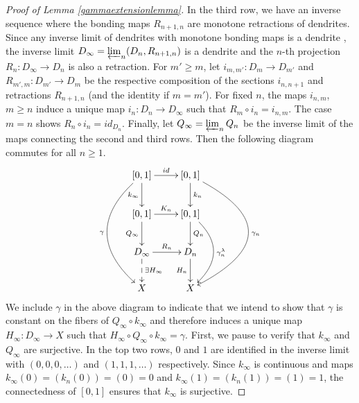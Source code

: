 \documentclass[12pt, leqno]{amsart}
\newcommand{\light}{\lambda}
\newcommand{\ui}{[0,1]}
\theoremstyle{definition}\newtheorem{definition}[theorem]{Definition}
\begin{document}
\begin{proof}[Proof of Lemma \ref{gammaextensionlemma}]
In the third row, we have an inverse sequence where the bonding maps $R_{n+1,n}$ are monotone retractions of dendrites. Since any inverse limit of dendrites with monotone bonding maps is a dendrite \cite[Theorem 10.36]{Nadler}, the inverse limit $D_{\infty}=\varprojlim_{n}(D_n,R_{n+1,n})$ is a dendrite and the $n$-th projection $R_n:D_{\infty}\to D_n$ is also a retraction. For $m'\geq m$, let $i_{m,m'}:D_m\to D_{m'}$ and $R_{m',m}:D_{m'}\to D_m$ be the respective composition of the sections $i_{n,n+1}$ and retractions $R_{n+1,n}$ (and the identity if $m=m'$). For fixed $n$, the maps $i_{n,m}$, $m\geq n$ induce a unique map $i_n:D_n\to D_{\infty}$ such that $R_m\circ i_n=i_{n,m}$. The case $m=n$ shows $R_n\circ i_n=id_{D_n}$. Finally, let $Q_{\infty}=\varprojlim_{n}Q_n$ be the inverse limit of the maps connecting the second and third rows. Then the following diagram commutes for all $n\geq 1$.
\[\xymatrix{
\ar@/_3pc/[ddd]_-{\gamma} \ui \ar[d]_-{k_{\infty}} \ar[r]^-{id} & \ui \ar[d]^-{k_{n}} \ar@/^5pc/[ddd]^-{\gamma_n}  \\
\ui \ar[r]^-{K_n} \ar[d]_-{Q_{\infty}} & \ui \ar@/^2pc/[dd]^-{\gamma_{n}^{\light}}\ar[d]^-{Q_n}\\
D_{\infty} \ar@{-->}[d]^-{\exists H_{\infty}}  \ar[r]^-{R_n} & D_n \ar[d]_-{H_n}  \\
X & X
}\]
We include $\gamma$ in the above diagram to indicate that we intend to show that $\gamma$ is constant on the fibers of $Q_{\infty}\circ k_{\infty}$ and therefore induces a unique map $H_{\infty}:D_{\infty}\to X$ such that $H_{\infty}\circ Q_{\infty}\circ k_{\infty}=\gamma$. First, we pause to verify that $k_{\infty}$ and $Q_{\infty}$ are surjective. In the top two rows, $0$ and $1$ are identified in the inverse limit with $(0,0,0,\dots)$ and $(1,1,1,\dots)$ respectively. Since $k_{\infty}$ is continuous and maps $k_{\infty}(0)=(k_n(0))=(0)=0$ and $k_{\infty}(1)=(k_n(1))=(1)=1$, the connectedness of $\ui$ ensures that $k_{\infty}$ is surjective.


\end{proof}
\end{document}
